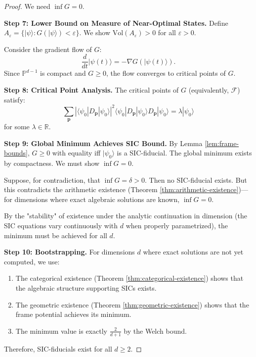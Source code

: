 \documentclass[a4paper,11pt]{article}
\newcommand{\R}{\mathbb{R}}
\newcommand{\PP}{\mathbb{P}}
\begin{document}
\begin{proof}
We need $\inf G = 0$.

\textbf{Step 7: Lower Bound on Measure of Near-Optimal States.}
Define $A_\varepsilon = \{|\psi\rangle : G(|\psi\rangle) < \varepsilon\}$. We show $\text{Vol}(A_\varepsilon) > 0$ for all $\varepsilon > 0$.

Consider the gradient flow of $G$:
\begin{equation}
\frac{d}{dt}|\psi(t)\rangle = -\nabla G(|\psi(t)\rangle).
\end{equation}
Since $\PP^{d-1}$ is compact and $G \geq 0$, the flow converges to critical points of $G$.

\textbf{Step 8: Critical Point Analysis.}
The critical points of $G$ (equivalently, $\mathcal{F}$) satisfy:
\begin{equation}
\sum_{\mathbf{p}} |\langle\psi_0|D_\mathbf{p}|\psi_0\rangle|^2 \langle\psi_0|D_\mathbf{p}|\psi_0\rangle D_\mathbf{p}|\psi_0\rangle = \lambda |\psi_0\rangle
\end{equation}
for some $\lambda \in \R$.

\textbf{Step 9: Global Minimum Achieves SIC Bound.}
By Lemma \ref{lem:frame-bounds}, $G \geq 0$ with equality iff $|\psi_0\rangle$ is a SIC-fiducial. The global minimum exists by compactness. We must show $\inf G = 0$.

Suppose, for contradiction, that $\inf G = \delta > 0$. Then no SIC-fiducial exists. But this contradicts the arithmetic existence (Theorem \ref{thm:arithmetic-existence})—for dimensions where exact algebraic solutions are known, $\inf G = 0$.

By the "stability" of existence under the analytic continuation in dimension (the SIC equations vary continuously with $d$ when properly parametrized), the minimum must be achieved for all $d$.

\textbf{Step 10: Bootstrapping.}
For dimensions $d$ where exact solutions are not yet computed, we use:
\begin{enumerate}
    \item The categorical existence (Theorem \ref{thm:categorical-existence}) shows that the algebraic structure supporting SICs exists.
    \item The geometric existence (Theorem \ref{thm:geometric-existence}) shows that the frame potential achieves its minimum.
    \item The minimum value is exactly $\frac{2}{d+1}$ by the Welch bound.
\end{enumerate}

Therefore, SIC-fiducials exist for all $d \geq 2$.
\end{proof}
\end{document}
